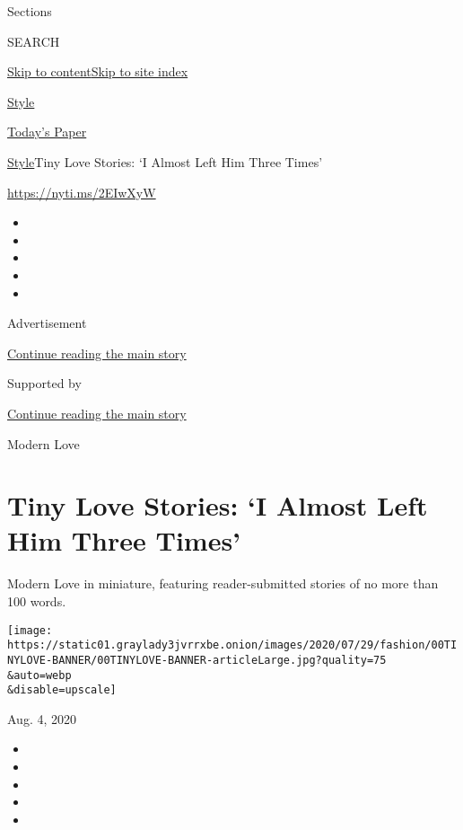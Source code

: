 Sections

SEARCH

\protect\hyperlink{site-content}{Skip to
content}\protect\hyperlink{site-index}{Skip to site index}

\href{https://www.nytimes3xbfgragh.onion/section/style}{Style}

\href{https://myaccount.nytimes3xbfgragh.onion/auth/login?response_type=cookie\&client_id=vi}{}

\href{https://www.nytimes3xbfgragh.onion/section/todayspaper}{Today's
Paper}

\href{/section/style}{Style}\textbar{}Tiny Love Stories: `I Almost Left
Him Three Times'

\url{https://nyti.ms/2EIwXyW}

\begin{itemize}
\item
\item
\item
\item
\item
\end{itemize}

Advertisement

\protect\hyperlink{after-top}{Continue reading the main story}

Supported by

\protect\hyperlink{after-sponsor}{Continue reading the main story}

Modern Love

\hypertarget{tiny-love-stories-i-almost-left-him-three-times}{%
\section{Tiny Love Stories: `I Almost Left Him Three
Times'}\label{tiny-love-stories-i-almost-left-him-three-times}}

Modern Love in miniature, featuring reader-submitted stories of no more
than 100 words.

\texttt{[image: https://static01.graylady3jvrrxbe.onion/images/2020/07/29/fashion/00TINYLOVE-BANNER/00TINYLOVE-BANNER-articleLarge.jpg?quality=75\\\&auto=webp\\\&disable=upscale]}

Aug. 4, 2020

\begin{itemize}
\item
\item
\item
\item
\item
\end{itemize}

